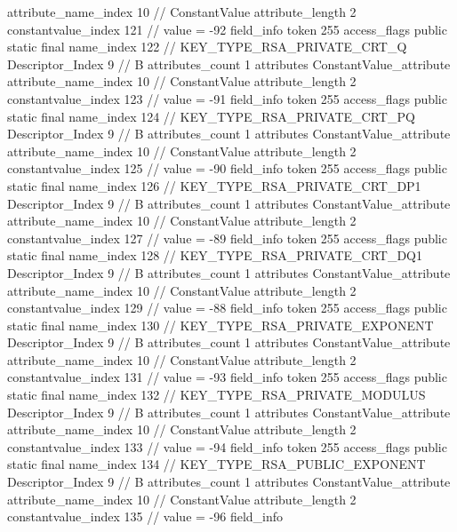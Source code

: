 {{{{{{{					attribute_name_index	10		// ConstantValue
					attribute_length	2
					constantvalue_index	121		// value = -92
				}
				}
			}
			field_info {
				token	255
				access_flags	public static final
				name_index	122		// KEY_TYPE_RSA_PRIVATE_CRT_Q
				Descriptor_Index	9		// B
				attributes_count	1
				attributes {
				ConstantValue_attribute {
					attribute_name_index	10		// ConstantValue
					attribute_length	2
					constantvalue_index	123		// value = -91
				}
				}
			}
			field_info {
				token	255
				access_flags	public static final
				name_index	124		// KEY_TYPE_RSA_PRIVATE_CRT_PQ
				Descriptor_Index	9		// B
				attributes_count	1
				attributes {
				ConstantValue_attribute {
					attribute_name_index	10		// ConstantValue
					attribute_length	2
					constantvalue_index	125		// value = -90
				}
				}
			}
			field_info {
				token	255
				access_flags	public static final
				name_index	126		// KEY_TYPE_RSA_PRIVATE_CRT_DP1
				Descriptor_Index	9		// B
				attributes_count	1
				attributes {
				ConstantValue_attribute {
					attribute_name_index	10		// ConstantValue
					attribute_length	2
					constantvalue_index	127		// value = -89
				}
				}
			}
			field_info {
				token	255
				access_flags	public static final
				name_index	128		// KEY_TYPE_RSA_PRIVATE_CRT_DQ1
				Descriptor_Index	9		// B
				attributes_count	1
				attributes {
				ConstantValue_attribute {
					attribute_name_index	10		// ConstantValue
					attribute_length	2
					constantvalue_index	129		// value = -88
				}
				}
			}
			field_info {
				token	255
				access_flags	public static final
				name_index	130		// KEY_TYPE_RSA_PRIVATE_EXPONENT
				Descriptor_Index	9		// B
				attributes_count	1
				attributes {
				ConstantValue_attribute {
					attribute_name_index	10		// ConstantValue
					attribute_length	2
					constantvalue_index	131		// value = -93
				}
				}
			}
			field_info {
				token	255
				access_flags	public static final
				name_index	132		// KEY_TYPE_RSA_PRIVATE_MODULUS
				Descriptor_Index	9		// B
				attributes_count	1
				attributes {
				ConstantValue_attribute {
					attribute_name_index	10		// ConstantValue
					attribute_length	2
					constantvalue_index	133		// value = -94
				}
				}
			}
			field_info {
				token	255
				access_flags	public static final
				name_index	134		// KEY_TYPE_RSA_PUBLIC_EXPONENT
				Descriptor_Index	9		// B
				attributes_count	1
				attributes {
				ConstantValue_attribute {
					attribute_name_index	10		// ConstantValue
					attribute_length	2
					constantvalue_index	135		// value = -96
				}
				}
			}
			field_info {
}}}}}
